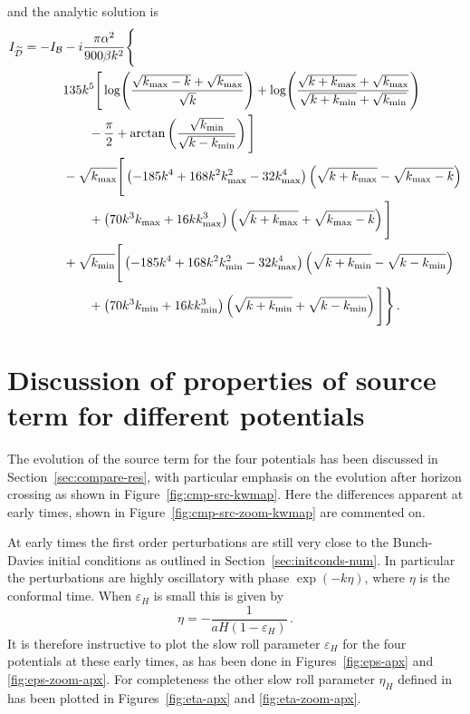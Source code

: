 % 
and the analytic solution is
% 
\begin{align}
\label{eq:dint-soln-num}
I_{\wt{\D}} = -I_\B &-i\frac{\pi\alpha^2}{900\beta k^2}\Bigg\{ \nonumber \\
        &135 k^5 \Bigg[ \log\Biggl(\frac{\sqrt{\kmax-k} + \sqrt{\kmax}}{\sqrt{k}}
                            \Biggr)
         + \log\Biggl( \frac{\sqrt{k+\kmax} +\sqrt{\kmax}}{\sqrt{k+\kmin} +
                          \sqrt{\kmin}}\Biggr) \nonumber \\
        &\qquad -\frac{\pi}{2} + \arctan\left(
\frac{\sqrt{\kmin}}{\sqrt{k-\kmin}}\right)
        \Bigg] \nonumber\\
% 
        &-\sqrt{\kmax}\Bigg[ \left(-185k^4 + 168k^2\kmax^2-32\kmax^4
            \right)\left(\sqrt{k+\kmax} - \sqrt{\kmax-k}\right) \nonumber \\
        &\qquad +\left(70k^3\kmax +16k\kmax^3\right) \left(\sqrt{k+\kmax} +
         \sqrt{\kmax -k} \right) \Bigg] \nonumber \\
% 
        &+\sqrt{\kmin}\Bigg[ \left(-185k^4 + 168k^2\kmin^2 -32\kmax^4
            \right)\left(\sqrt{k+\kmin} - \sqrt{k-\kmin}\right) \nonumber \\
        &\qquad +\left(70k^3\kmin +16k\kmin^3\right) \left(\sqrt{k+\kmin} +
         \sqrt{k-\kmin} \right) \Bigg] \Bigg\} \,.
\end{align}
% 


\section{Discussion of properties of source term for different potentials}
\label{sec:apx-srcdisc}
The evolution of the source term for the four potentials has been discussed in
Section~\ref{sec:compare-res}, with particular emphasis on the evolution after horizon crossing as
shown in Figure~\ref{fig:cmp-src-kwmap}. Here the differences apparent at early times, shown in
Figure~\ref{fig:cmp-src-zoom-kwmap} are commented on.

At early times the first order perturbations are still very close to the Bunch-Davies initial
conditions as outlined in Section~\ref{sec:initconds-num}. In particular the perturbations are
highly oscillatory with phase $\exp(-k\eta)$, where $\eta$ is the conformal time. When
$\varepsilon_H$ is small this is given by 
% 
\begin{equation}
 \eta = -\frac{1}{aH(1-\varepsilon_H)}\,.
\end{equation}
% 
It is therefore instructive to plot the slow roll parameter $\varepsilon_H$ for the four potentials
at these early times, as has been done in Figures~\ref{fig:eps-apx} and \ref{fig:eps-zoom-apx}. For
completeness the other slow roll parameter $\eta_H$ defined in  has been
plotted in Figures~\ref{fig:eta-apx} and \ref{fig:eta-zoom-apx}. 

